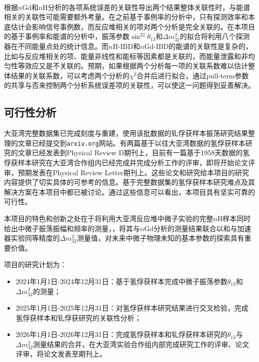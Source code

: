 \documentclass[a4paper,zihao=-4]{article}
\begin{document}
 \paragraph{}根据$n$Gd和$n$H分析的各项系统误差的关联性导出两个结果整体关联性时，与能谱相关的关联性可能需要额外考量。在之前基于事例率的分析中，只有探测效率和本底估计会影响信号事例数，而反应堆相关的项对两个分析是完全关联的。在本项目的基于事例率和能谱的分析中，振荡参数$\sin^22\theta_{13}$和$\Delta m_{32}^2$的拟合将利用八个探测器在不同能量点处的统计信息。而$n$H-IBD和$n$Gd-IBD的能谱的关联性是复杂的，比如与反应堆相关的项、能量非线性和能标等因素都是关联的，而能量泄露和非均匀性等效应又是不关联的。预期，如果根据两个分析每一项的关联系数难以估计整体结果的关联系数，可以考虑两个分析的$\chi^2$合并后进行拟合，通过pull-term参数的共享与否来控制两个分析系统误差项的关联性，可以使这一问题得到妥善解决。

\subsection{可行性分析}

大亚湾完整数据集已完成刻度与重建，使用该批数据的钆俘获样本振荡研究结果整理的文章已经提交到\texttt{arxiv.org}网站。有两篇基于以往大亚湾数据的氢俘获样本研究的文章已经发表到Physical Review D期刊上，目前有一篇基于1958天数据的氢俘获样本研究在大亚湾合作组内已经完成并完成分析工作的评审，即将开始论文评审，预期发表在Physical Review Letter期刊上。这些论文和研究给本项目的研究内容提供了切实具体的可参考的信息。基于完整数据集的氢俘获样本研究难点及其解决方案在本项目中都已被讨论。通过这些信息可以看出，本项目具有坚实可靠的可行性。


本项目的特色和创新之处在于将利用大亚湾反应堆中微子实验的完整$n$H样本同时给出中微子振荡振幅和频率的测量，，将其与$n$Gd分析的测量结果联合以和与加速器实验同等精度的$\Delta m_{32}^2$测量值，对未来中微子物理未知的基本参数的探索具有重要价值。


项目的研究计划为：
\begin{itemize}
	\item 2024年1月1日-2024年12月31日：基于氢俘获样本完成中微子振荡参数$\theta_{13}$和$\Delta m_{32}^2$的测量；
	\item 2025年1月1日-2025年12月31日：对氢俘获样本研究结果进行交叉检验，完成氢俘获样本和钆俘获研究的关联性分析；
	\item 2026年1月1日-2026年12月31日：完成氢俘获样本和钆俘获样本研究的$\theta_{13}$与$\Delta m_{32}^2$测量结果的合并，在大亚湾实验合作组内部完成研究工作的评审、论文评审，将论文发表至期刊上。
\end{itemize}
\end{document}
